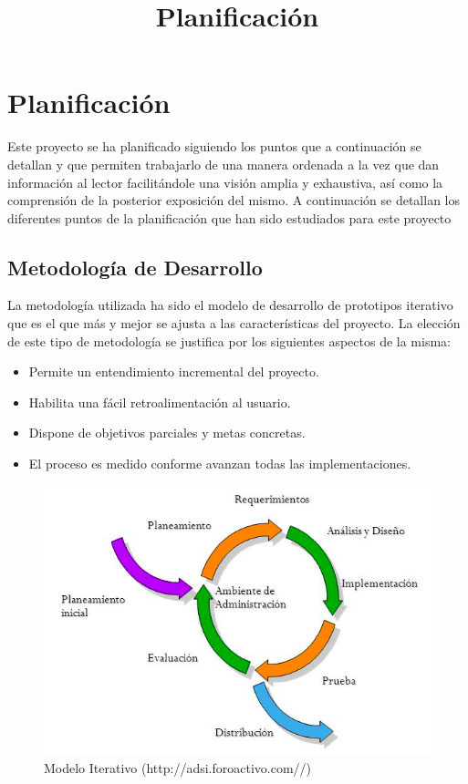 \chapter{Planificación}
\title{Planificación}
\label{cap:Planificacion}

Este proyecto se ha planificado siguiendo los puntos que a continuación se detallan y que permiten trabajarlo de una manera ordenada a la vez que dan información al lector facilitándole una visión amplia y exhaustiva, así como la comprensión de la posterior exposición del mismo. A continuación se detallan los diferentes puntos de la planificación que han sido estudiados para este proyecto

\section{Metodología de Desarrollo}
La metodología utilizada ha sido el modelo de desarrollo de prototipos iterativo que es el que más y mejor se ajusta a las características del proyecto. La elección de este tipo de metodología se justifica por los siguientes aspectos de la misma:

\begin{itemize}
  \item Permite un entendimiento incremental del proyecto.
  \item Habilita una fácil retroalimentación al usuario.
  \item Dispone de objetivos parciales y metas concretas.
  \item El proceso es medido conforme avanzan todas las implementaciones.
\end{itemize}

\begin{figure}[htb]
\centering
\includegraphics[width=1\textwidth]{./imagenes/modeloIterativo}
\caption{Modelo Iterativo (http://adsi.foroactivo.com//)} \label{fig:modeloIterativo}
\end{figure}

